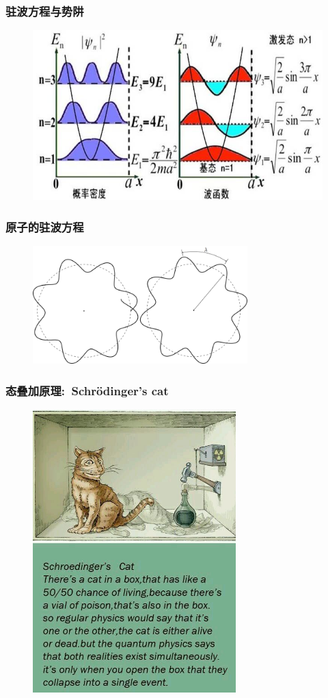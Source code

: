 \frame
{
	\frametitle{驻波方程与势阱}
\begin{figure}[h!]
\centering
\vspace{-0.5pt}
\includegraphics[height=0.46\textwidth,width=1.0\textwidth,viewport=0 0 650 390,clip]{Figures/Standing_wave_Energy.jpeg}
\label{Standing_Wave_2}
\end{figure}
}

\frame
{
	\frametitle{原子的驻波方程}
\begin{figure}[h!]
	\vspace{-10.5pt}
\centering
\includegraphics[height=0.38\textwidth,width=0.74\textwidth,viewport=0 0 840 440,clip]{Figures/Standing_wave-atom.png}
\vskip 2pt
\label{Atomic_Standing_wave}
\end{figure}
}

\frame
{
	\frametitle{态叠加原理:~\textrm{Schr\"odinger's cat}}
\begin{figure}[h!]
\centering
\vspace{-10.5pt}
\includegraphics[height=0.70\textwidth,width=0.7\textwidth,viewport=0 0 760 750,clip]{Figures/Schrodinger-cat.jpg}
\label{Schrodinger-cat}
\end{figure}
}

